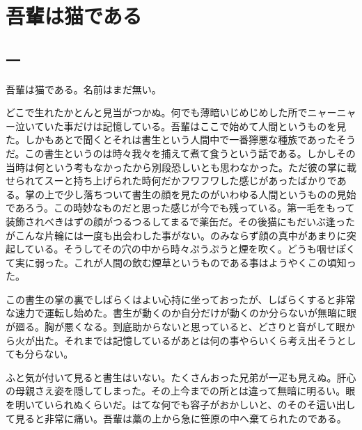 \documentclass[12pt, openright]{book}
\begin{document}
\part*{吾輩は猫である}
\chapter*{\centering 一}
吾輩は猫である。名前はまだ無い。

どこで生れたかとんと見当がつかぬ。何でも薄暗いじめじめした所でニャーニャー泣いていた事だけは記憶している。吾輩はここで始めて人間というものを見た。しかもあとで聞くとそれは書生という人間中で一番獰悪な種族であったそうだ。この書生というのは時々我々を捕えて煮て食うという話である。しかしその当時は何という考もなかったから別段恐しいとも思わなかった。ただ彼の掌に載せられてスーと持ち上げられた時何だかフワフワした感じがあったばかりである。掌の上で少し落ちついて書生の顔を見たのがいわゆる人間というものの見始であろう。この時妙なものだと思った感じが今でも残っている。第一毛をもって装飾されべきはずの顔がつるつるしてまるで薬缶だ。その後猫にもだいぶ逢ったがこんな片輪には一度も出会わした事がない。のみならず顔の真中があまりに突起している。そうしてその穴の中から時々ぷうぷうと煙を吹く。どうも咽せぽくて実に弱った。これが人間の飲む煙草というものである事はようやくこの頃知った。

この書生の掌の裏でしばらくはよい心持に坐っておったが、しばらくすると非常な速力で運転し始めた。書生が動くのか自分だけが動くのか分らないが無暗に眼が廻る。胸が悪くなる。到底助からないと思っていると、どさりと音がして眼から火が出た。それまでは記憶しているがあとは何の事やらいくら考え出そうとしても分らない。

ふと気が付いて見ると書生はいない。たくさんおった兄弟が一疋も見えぬ。肝心の母親さえ姿を隠してしまった。その上今までの所とは違って無暗に明るい。眼を明いていられぬくらいだ。はてな何でも容子がおかしいと、のそのそ這い出して見ると非常に痛い。吾輩は藁の上から急に笹原の中へ棄てられたのである。
\end{document}

